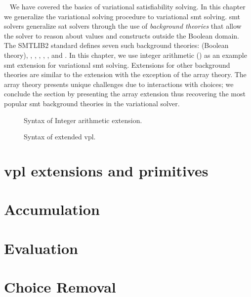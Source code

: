 ~\label{chapter:vsmt}
%
We have covered the basics of variational satisfiability solving. In this
chapter we generalize the variational solving procedure to variational \ac{smt}
solving.
\ac{smt} solvers generalize \ac{sat} solvers through the use of \emph{background
  theories} that allow the solver to reason about values and constructs outside
the Boolean domain. The SMTLIB2 standard defines seven such background theories:
 (Boolean theory), , ,
, , , and . In this chapter,
we use integer arithmetic () as an example \ac{smt} extension for
variational \ac{smt} solving. Extensions for other background theories are
similar to the  extension with the exception of the array theory. The
array theory presents unique challenges due to interactions with choices; we
conclude the section by presenting the array extension thus recovering the most
popular \ac{smt} background theories in the variational solver.

\begin{figure}
  \centering
  
  \caption{Syntax of Integer arithmetic extension.}%
  \label{fig:arith:stx}
\end{figure}
%
\begin{figure}

\centering
\caption{Syntax of extended \ac{vpl}.}%
\label{fig:arith:vpl}
\end{figure}

\section{\ac{vpl} extensions and primitives}
%

\section{Accumulation}
%

\section{Evaluation}
%

\section{Choice Removal}
%

